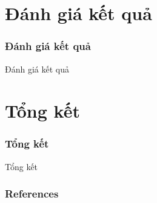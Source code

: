 \documentclass{beamer}
\begin{document}

\section{Đánh giá kết quả}
\begin{frame}
\frametitle{Đánh giá kết quả}
{\Huge Đánh giá kết quả}
\end{frame}

\section{Tổng kết}
\begin{frame}
\frametitle{Tổng kết}
{\Huge Tổng kết}
\end{frame}

\begin{frame}
\frametitle{References}
\newpage


\end{frame}



\begin{frame}
\Huge{}
\end{frame}

\end{document}
